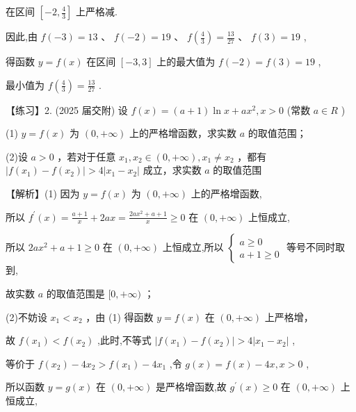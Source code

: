\documentclass[10pt]{article}
\begin{document}
在区间 \(\left\lbrack  {-2,\frac{4}{3}}\right\rbrack\) 上严格减.

因此,由 \(f\left( {-3}\right)  = {13}\text{ 、 }f\left( {-2}\right)  = {19}\text{ 、 }f\left( \frac{4}{3}\right)  = \frac{13}{27}\text{ 、 }f\left( 3\right)  = {19}\) ,

得函数 \(y = f\left( x\right)\) 在区间 \(\left\lbrack  {-3,3}\right\rbrack\) 上的最大值为 \(f\left( {-2}\right)  = f\left( 3\right)  = {19}\) ,

最小值为 \(f\left( \frac{4}{3}\right)  = \frac{13}{27}\) .

【练习】2. (2025 届交附) 设 \(f\left( x\right)  = \left( {a + 1}\right) \ln x + a{x}^{2},x > 0\) (常数 \(a \in  R\) )

(1) \(y = f\left( x\right)\) 为 \(\left( {0, + \infty }\right)\) 上的严格增函数，求实数 \(a\) 的取值范围；

(2)设 \(a > 0\) ，若对于任意 \({x}_{1},{x}_{2} \in  \left( {0, + \infty }\right) ,{x}_{1} \neq  {x}_{2}\) ，都有 \(\left| {f\left( {x}_{1}\right)  - f\left( {x}_{2}\right) }\right|  > 4\left| {{x}_{1} - {x}_{2}}\right|\) 成立，求实数 \(a\) 的取值范围

【解析】(1) 因为 \(y = f\left( x\right)\) 为 \(\left( {0, + \infty }\right)\) 上的严格增函数,

所以 \({f}^{\prime }\left( x\right)  = \frac{a + 1}{x} + {2ax} = \frac{{2a}{x}^{2} + a + 1}{x} \geq  0\) 在 \(\left( {0, + \infty }\right)\) 上恒成立,

所以 \({2a}{x}^{2} + a + 1 \geq  0\) 在 \(\left( {0, + \infty }\right)\) 上恒成立,所以 \(\left\{  \begin{array}{l} a \geq  0 \\  a + 1 \geq  0 \end{array}\right.\) 等号不同时取到,

故实数 \(a\) 的取值范围是 \(\lbrack 0, + \infty )\) ；

(2)不妨设 \({x}_{1} < {x}_{2}\) ，由 (1) 得函数 \(y = f\left( x\right)\) 在 \(\left( {0, + \infty }\right)\) 上严格增，

故 \(f\left( {x}_{1}\right)  < f\left( {x}_{2}\right)\) ,此时,不等式 \(\left| {f\left( {x}_{1}\right)  - f\left( {x}_{2}\right) }\right|  > 4\left| {{x}_{1} - {x}_{2}}\right|\) ,

等价于 \(f\left( {x}_{2}\right)  - 4{x}_{2} > f\left( {x}_{1}\right)  - 4{x}_{1}\) ,令 \(g\left( x\right)  = f\left( x\right)  - {4x},x > 0\) ,

所以函数 \(y = g\left( x\right)\) 在 \(\left( {0, + \infty }\right)\) 是严格增函数,故 \({g}^{\prime }\left( x\right)  \geq  0\) 在 \(\left( {0, + \infty }\right)\) 上恒成立,
\end{document}
